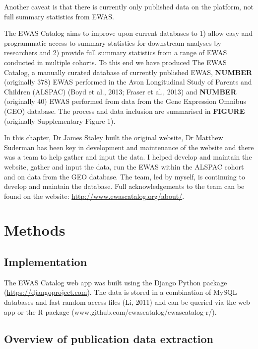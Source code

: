 \documentclass[11pt,twoside]{bristolthesis}
\begin{document}
Another caveat is that there is currently only published data on the platform, not full summary statistics from EWAS.

The EWAS Catalog aims to improve upon current databases to 1) allow easy and programmatic access to summary statistics for downstream analyses by researchers and 2) provide full summary statistics from a range of EWAS conducted in multiple cohorts. To this end we have produced The EWAS Catalog, a manually curated database of currently published EWAS, \textbf{NUMBER} (originally 378) EWAS performed in the Avon Longitudinal Study of Parents and Children (ALSPAC) (Boyd et al., 2013; Fraser et al., 2013) and \textbf{NUMBER} (originally 40) EWAS performed from data from the Gene Expression Omnibus (GEO) database. The process and data inclusion are summarised in \textbf{FIGURE} (originally Supplementary Figure 1).

In this chapter, Dr James Staley built the original website, Dr Matthew Suderman has been key in development and maintenance of the website and there was a team to help gather and input the data. I helped develop and maintain the website, gather and input the data, run the EWAS within the ALSPAC cohort and on data from the GEO database. The team, led by myself, is continuing to develop and maintain the database. Full acknowledgements to the team can be found on the website: \url{http://www.ewascatalog.org/about/}.

\hypertarget{methods-1}{%
\section{Methods}\label{methods-1}}

\hypertarget{implementation}{%
\subsection{Implementation}\label{implementation}}

The EWAS Catalog web app was built using the Django Python package (\url{https://djangoproject.com}). The data is stored in a combination of MySQL databases and fast random access files (Li, 2011) and can be queried via the web app or the R package (www.github.com/ewascatalog/ewascatalog-r/).

\hypertarget{overview-of-publication-data-extraction}{%
\subsection{Overview of publication data extraction}\label{overview-of-publication-data-extraction}}
\end{document}
